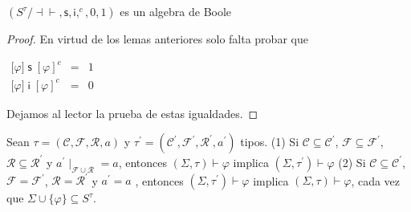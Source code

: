   \begin{lemma}
    \((S^{\tau }/\mathrm{\dashv \vdash },\mathsf{s},\mathsf{i},^{c},0,1)\) es un algebra de Boole
  \end{lemma}
  \begin{proof}
    En virtud de los lemas anteriores solo falta probar que

    \(\displaystyle \begin{array}{rcl} \lbrack \varphi ]\;\mathsf{s}\;[\varphi ]^{c} & =& 1 \\ \lbrack \varphi ]\;\mathsf{i}\;[\varphi ]^{c} & =& 0 \end{array} \)

    Dejamos al lector la prueba de estas igualdades.
  \end{proof}

  \begin{lemma}
    Sean \(\tau =(\mathcal{C},\mathcal{F},\mathcal{R},a)\) y \(\tau ^{\prime }=(\mathcal{C}^{\prime },\mathcal{F}^{\prime },\mathcal{R} ^{\prime },a^{\prime })\) tipos.
    (1) Si \(\mathcal{C}\subseteq \mathcal{C}^{\prime }\), \(\mathcal{F} \subseteq \mathcal{F}^{\prime }\), \(\mathcal{R}\subseteq \mathcal{R}^{\prime } \) y \(a^{\prime }\mid _{\mathcal{F}\cup \mathcal{R}}=a\), entonces \((\Sigma ,\tau )\vdash \varphi \) implica \((\Sigma ,\tau ^{\prime })\vdash \varphi \)
    (2) Si \(\mathcal{C}\subseteq \mathcal{C}^{\prime }\), \(\mathcal{F}= \mathcal{F}^{\prime }\), \(\mathcal{R}=\mathcal{R}^{\prime }\) y \(a^{\prime }=a\) , entonces \((\Sigma ,\tau ^{\prime })\vdash \varphi \) implica \((\Sigma ,\tau )\vdash \varphi \), cada vez que \(\Sigma \cup \{\varphi \}\subseteq S^{\tau }. \)
  \end{lemma}

